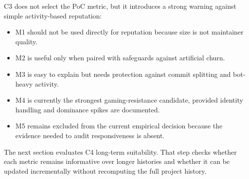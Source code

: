 C3 does not select the PoC metric, but it introduces a strong warning against simple activity-based reputation:
\begin{itemize}[leftmargin=*]
  \item M1 should not be used directly for reputation because size is not maintainer quality.
  \item M2 is useful only when paired with safeguards against artificial churn.
  \item M3 is easy to explain but needs protection against commit splitting and bot-heavy activity.
  \item M4 is currently the strongest gaming-resistance candidate, provided identity handling and dominance spikes are documented.
  \item M5 remains excluded from the current empirical decision because the evidence needed to audit responsiveness is absent.
\end{itemize}

The next section evaluates C4 long-term suitability. That step checks whether each metric remains informative over
longer histories and whether it can be updated incrementally without recomputing the full project history.
